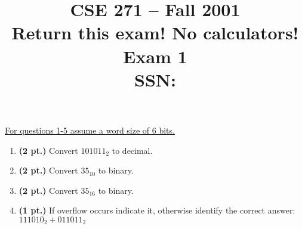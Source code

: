 \documentclass{article}
\begin{document}
\newcommand{\SOPmin}{${\rm SOP}_{\rm min} \ $}
\newcommand{\POSmin}{${\rm POS}_{\rm min} \ $}
\newcommand{\bs}{\backslash}


\title{
\Huge{CSE 271 -- Fall 2001}\\
\normalsize{Return this exam!  No calculators!}\\
\normalsize{Exam 1}\\
SSN:}
\date{}

\maketitle{}

\underline{For questions 1-5 assume a word size of 6 bits.}
\

\begin{enumerate}
\item {\bf (2 pt.)} Convert $101011_2$ to decimal.

\item {\bf (2 pt.)} Convert $35_{10}$ to binary.

\item {\bf (2 pt.)} Convert $35_{16}$ to binary.
\pagebreak
\item {\bf (1 pt.)} If overflow occurs indicate it, otherwise identify
the correct answer: $111010_2 + 011011_2$


\end{enumerate}
\end{document}
